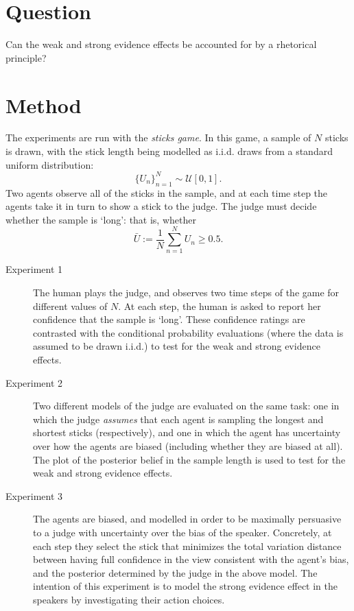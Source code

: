 \documentclass{article}
\begin{document}
\section{Question}
Can the weak and strong evidence effects be accounted for by a rhetorical principle?

\section{Method}

The experiments are run with the \textit{sticks game}. In this game, a sample of $N$ sticks is drawn, with the stick length being modelled as i.i.d. draws from a standard uniform distribution: \[ \{ U_n\}_{n=1}^N \sim \mathcal{U}[0, 1] .\] Two agents observe all of the sticks in the sample, and at each time step the agents take it in turn to show a stick to the judge. The judge must decide whether the sample is `long': that is, whether \[ \bar{U} := \frac{1}{N} \sum_{n=1}^N U_n \ge 0.5 .\]

\begin{description}
\item[Experiment 1] The human plays the judge, and observes two time steps of the game for different values of $N$. At each step, the human is asked to report her confidence that the sample is `long'. These confidence ratings are contrasted with the conditional probability evaluations (where the data is assumed to be drawn i.i.d.) to test for the weak and strong evidence effects.

\item[Experiment 2] Two different models of the judge are evaluated on the same task: one in which the judge \textit{assumes} that each agent is sampling the longest and shortest sticks (respectively), and one in which the agent has uncertainty over how the agents are biased (including whether they are biased at all). The plot of the posterior belief in the sample length is used to test for the weak and strong evidence effects.

 \item[Experiment 3] The agents are biased, and modelled in order to be maximally persuasive to a judge with uncertainty over the bias of the speaker. Concretely, at each step they select the stick that minimizes the total variation distance between having full confidence in the view consistent with the agent's bias, and the posterior determined by the judge in the above model. The intention of this experiment is to model the strong evidence effect in the speakers by investigating their action choices.
\end{description}

\printbibliography
\end{document}
